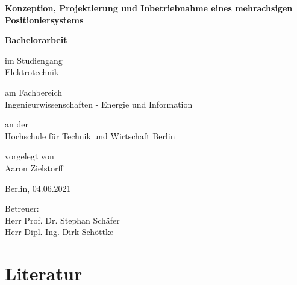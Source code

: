 \documentclass[12pt, a4paper, twoside]{article} %
\begin{document}
\begin{titlepage}
	\begin{center}
	\vspace*{0.2cm}
	
	\huge
	\textbf{Konzeption, Projektierung und Inbetriebnahme eines mehrachsigen Positioniersystems}
	
	\vspace*{2.0cm}
	\Large
	\textbf{Bachelorarbeit}
	
	\vspace*{1.2cm}
	\normalsize
	im Studiengang\\
	\Large
	Elektrotechnik
	
	\vspace*{0.9cm}
	\normalsize
	am Fachbereich\\
	\Large
	Ingenieurwissenschaften - Energie und Information
	
	\vspace*{0.9cm}
	\normalsize
	an der\\
	\Large
	Hochschule für Technik und Wirtschaft Berlin
	
	\vspace*{1.6cm}
	\normalsize
	vorgelegt von\\
	\Large
	Aaron Zielstorff
	
	\vspace*{0.7cm}
	\normalsize
	Berlin, 04.06.2021
	
	\vspace*{1.6cm}
	\normalsize
	Betreuer:\\
	Herr Prof. Dr. Stephan Schäfer\\
	Herr Dipl.-Ing. Dirk Schöttke
	
	\end{center}
\end{titlepage}


\setcounter{tocdepth}{2} %
\tableofcontents
\thispagestyle{empty}
\clearpage





\newpage
\section*{Literatur}

\nocite{Winkelhake2021}
\nocite{Geisberger2012}
\nocite{Bauernhansl2014}
\nocite{Pistorius2020}

\printbibliography[
	heading=subbibintoc,
	type=book,
	title={Bücher}
]
	

\nocite{Wissenschaft2013}

\printbibliography[
	heading=subbibintoc,
	type=article,
	title={Artikel}
]
\end{document}
